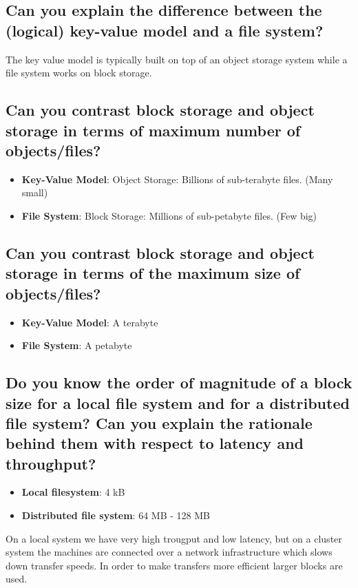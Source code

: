\documentclass{article}
\begin{document}
\subsection{Can you explain the difference between the (logical) key-value model and a file system?}

The key value model is typically built on top of an object storage system while a file system works on block storage.

\subsection{Can you contrast block storage and object storage in terms of maximum number of objects/files?}

\begin{itemize}
    \item \textbf{Key-Value Model}: Object Storage: Billions of sub-terabyte files. (Many small)
    \item \textbf{File System}: Block Storage: Millions of sub-petabyte files. (Few big)
\end{itemize}

\subsection{Can you contrast block storage and object storage in terms of the maximum size of objects/files?}

\begin{itemize}
    \item \textbf{Key-Value Model}: A terabyte
    \item \textbf{File System}: A petabyte
\end{itemize}

\subsection{Do you know the order of magnitude of a block size for a local file system and for a distributed file system? Can you explain the rationale behind them with respect to latency and throughput?}

\begin{itemize}
    \item \textbf{Local filesystem}: 4 kB
    \item \textbf{Distributed file system}: 64 MB - 128 MB
\end{itemize}

On a local system we have very high trougput and low latency, but on a cluster system the machines are connected over a network infrastructure which slows down transfer speeds. In order to make transfers more efficient larger blocks are used.
\end{document}
